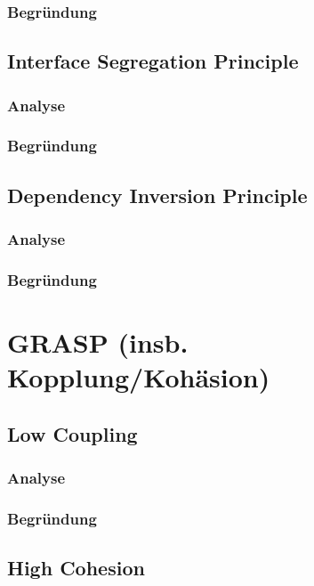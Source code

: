 		\subsubsection{Begründung}

	\subsection{Interface Segregation Principle}

		\subsubsection{Analyse}

		\subsubsection{Begründung}

	\subsection{Dependency Inversion Principle}

		\subsubsection{Analyse}

		\subsubsection{Begründung}

\section{GRASP (insb. Kopplung/Kohäsion)}

	\subsection{Low Coupling}

		\subsubsection{Analyse}

		\subsubsection{Begründung}

	\subsection{High Cohesion}

